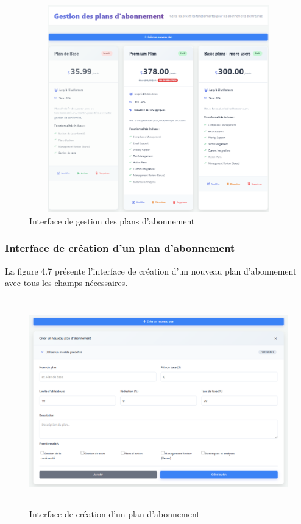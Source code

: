 \begin{figure}[H]
    \centering
    \includegraphics[width=13cm,height=9cm]{images/gestionplansinterface.PNG}
    \caption{Interface de gestion des plans d'abonnement}
\end{figure}

\subsubsection{Interface de création d'un plan d'abonnement}
\noindent La figure 4.7 présente l'interface de création d'un nouveau plan d'abonnement avec tous les champs nécessaires.

\begin{figure}[H]
    \centering
    \includegraphics[width=13cm,height=9cm]{images/createplanmodal.PNG}
    \caption{Interface de création d'un plan d'abonnement}
\end{figure}

